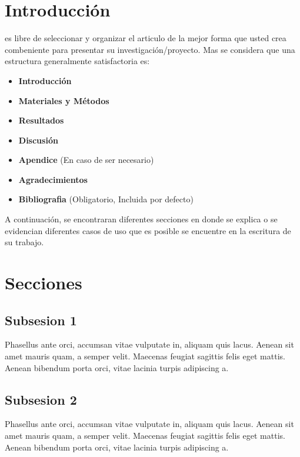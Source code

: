 \documentclass[colTwo]{NanouparIEEE}
\begin{document}
    \section{Introducción}
         es libre de seleccionar y organizar el articulo de la mejor forma que usted crea combeniente para presentar su investigación/proyecto. Mas se considera que una estructura generalmente satisfactoria es:

        \begin{itemize}
            \item \textbf{Introducción}
            \item \textbf{Materiales y Métodos}
            \item \textbf{Resultados}
            \item \textbf{Discusión}
            \item \textbf{Apendice} (En caso de ser necesario)
            \item \textbf{Agradecimientos}
            \item \textbf{Bibliografia} (Obligatorio, Incluida por defecto)
        \end{itemize}

        A continuación, se encontraran diferentes secciones en donde se explica o se evidencian diferentes casos de uso que es posible se encuentre en la escritura de su trabajo.
        
        
	
    \section{Secciones}

        \subsection{Subsesion 1}
            Phasellus ante orci, accumsan vitae vulputate in, aliquam quis lacus. Aenean sit amet mauris quam, a semper velit. Maecenas feugiat sagittis felis eget mattis. Aenean bibendum porta orci, vitae lacinia turpis adipiscing a. 

        \subsection{Subsesion 2}
            Phasellus ante orci, accumsan vitae vulputate in, aliquam quis lacus. Aenean sit amet mauris quam, a semper velit. Maecenas feugiat sagittis felis eget mattis. Aenean bibendum porta orci, vitae lacinia turpis adipiscing a. 
            
\end{document}
